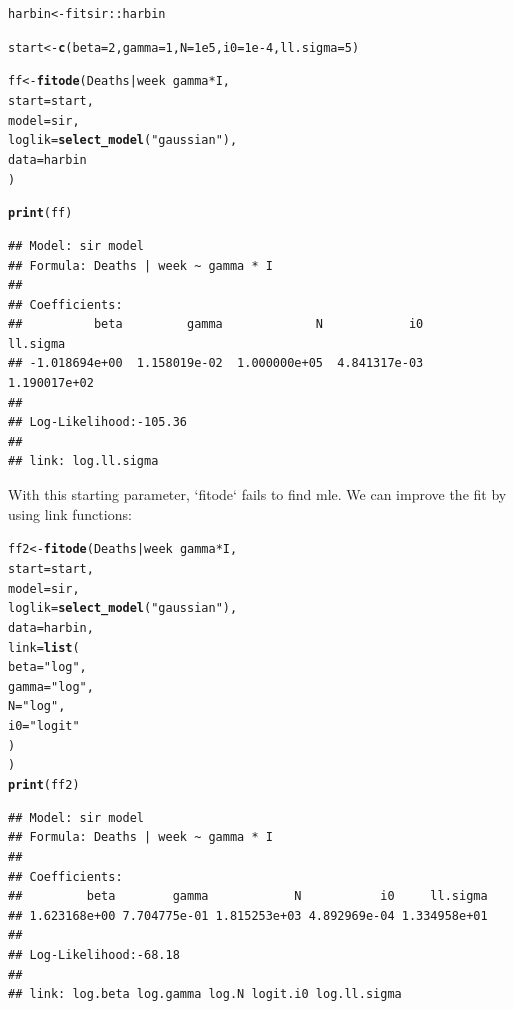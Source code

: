 \documentclass{article}\usepackage[]{graphicx}\usepackage[]{color}
\makeatletter
\newcommand{\hlnum}[1]{\textcolor[rgb]{0.686,0.059,0.569}{#1}}%
\newcommand{\hlstr}[1]{\textcolor[rgb]{0.192,0.494,0.8}{#1}}%
\newcommand{\hlopt}[1]{\textcolor[rgb]{0,0,0}{#1}}%
\newcommand{\hlstd}[1]{\textcolor[rgb]{0.345,0.345,0.345}{#1}}%
\newcommand{\hlkwb}[1]{\textcolor[rgb]{0.69,0.353,0.396}{#1}}%
\newcommand{\hlkwc}[1]{\textcolor[rgb]{0.333,0.667,0.333}{#1}}%
\newcommand{\hlkwd}[1]{\textcolor[rgb]{0.737,0.353,0.396}{\textbf{#1}}}%
\newenvironment{kframe}{%
 \def\at@end@of@kframe{}%
 \ifinner\ifhmode%
  \def\at@end@of@kframe{\end{minipage}}%
  \begin{minipage}{\columnwidth}%
 \fi\fi%
 \def\FrameCommand##1{\hskip\@totalleftmargin \hskip-\fboxsep
 \colorbox{shadecolor}{##1}\hskip-\fboxsep
     \hskip-\linewidth \hskip-\@totalleftmargin \hskip\columnwidth}%
 \MakeFramed {\advance\hsize-\width
   \@totalleftmargin\z@ \linewidth\hsize
   \@setminipage}}%
 {\par\unskip\endMakeFramed%
 \at@end@of@kframe}
\newenvironment{knitrout}{}{} %
\makeatother
\begin{document}
\begin{knitrout}
\color{fgcolor}\begin{kframe}
\begin{alltt}
\hlstd{harbin} \hlkwb{<-} \hlstd{fitsir}\hlopt{::}\hlstd{harbin}

\hlstd{start} \hlkwb{<-} \hlkwd{c}\hlstd{(}\hlkwc{beta}\hlstd{=}\hlnum{2}\hlstd{,} \hlkwc{gamma}\hlstd{=}\hlnum{1}\hlstd{,} \hlkwc{N}\hlstd{=}\hlnum{1e5}\hlstd{,} \hlkwc{i0}\hlstd{=}\hlnum{1e-4}\hlstd{,} \hlkwc{ll.sigma}\hlstd{=}\hlnum{5}\hlstd{)}

\hlstd{ff} \hlkwb{<-} \hlkwd{fitode}\hlstd{(Deaths}\hlopt{|}\hlstd{week}\hlopt{~}\hlstd{gamma}\hlopt{*}\hlstd{I,}
    \hlkwc{start}\hlstd{=start,}
    \hlkwc{model}\hlstd{=sir,}
    \hlkwc{loglik}\hlstd{=}\hlkwd{select_model}\hlstd{(}\hlstr{"gaussian"}\hlstd{),}
    \hlkwc{data}\hlstd{=harbin}
\hlstd{)}


\hlkwd{print}\hlstd{(ff)}
\end{alltt}
\begin{verbatim}
## Model: sir model 
## Formula: Deaths | week ~ gamma * I 
## 
## Coefficients:
##          beta         gamma             N            i0      ll.sigma 
## -1.018694e+00  1.158019e-02  1.000000e+05  4.841317e-03  1.190017e+02 
## 
## Log-Likelihood:-105.36 
## 
## link: log.ll.sigma
\end{verbatim}
\end{kframe}
\end{knitrout}

With this starting parameter, `fitode` fails to find mle. We can improve the fit by using link functions:

\begin{knitrout}
\color{fgcolor}\begin{kframe}
\begin{alltt}
\hlstd{ff2} \hlkwb{<-} \hlkwd{fitode}\hlstd{(Deaths}\hlopt{|}\hlstd{week}\hlopt{~}\hlstd{gamma}\hlopt{*}\hlstd{I,}
    \hlkwc{start}\hlstd{=start,}
    \hlkwc{model}\hlstd{=sir,}
    \hlkwc{loglik}\hlstd{=}\hlkwd{select_model}\hlstd{(}\hlstr{"gaussian"}\hlstd{),}
    \hlkwc{data}\hlstd{=harbin,}
    \hlkwc{link}\hlstd{=}\hlkwd{list}\hlstd{(}
        \hlkwc{beta}\hlstd{=}\hlstr{"log"}\hlstd{,}
        \hlkwc{gamma}\hlstd{=}\hlstr{"log"}\hlstd{,}
        \hlkwc{N}\hlstd{=}\hlstr{"log"}\hlstd{,}
        \hlkwc{i0}\hlstd{=}\hlstr{"logit"}
    \hlstd{)}
\hlstd{)}
\hlkwd{print}\hlstd{(ff2)}
\end{alltt}
\begin{verbatim}
## Model: sir model 
## Formula: Deaths | week ~ gamma * I 
## 
## Coefficients:
##         beta        gamma            N           i0     ll.sigma 
## 1.623168e+00 7.704775e-01 1.815253e+03 4.892969e-04 1.334958e+01 
## 
## Log-Likelihood:-68.18 
## 
## link: log.beta log.gamma log.N logit.i0 log.ll.sigma
\end{verbatim}
\end{kframe}
\end{knitrout}
\end{document}
